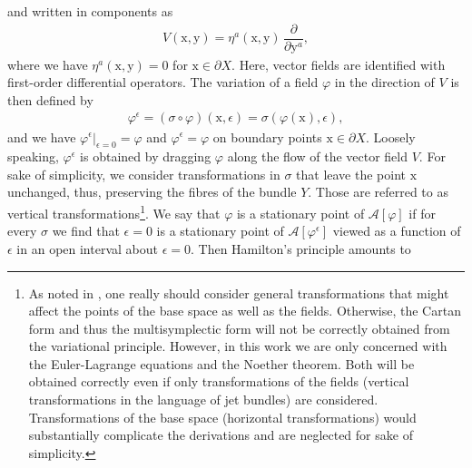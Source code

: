 \documentclass[12pt,a4paper,reqno]{article}
\begin{document}
and written in components as
\begin{align}
V ({\ensuremath{{\ensuremath{\mathrm{{x}}}}}}, {\ensuremath{{\ensuremath{\mathrm{{y}}}}}}) = \eta^{a} ({\ensuremath{{\ensuremath{\mathrm{{x}}}}}}, {\ensuremath{{\ensuremath{\mathrm{{y}}}}}}) \, \dfrac{\partial}{\partial {\ensuremath{{\ensuremath{\mathrm{{y}}}}}}^{a}} ,
\end{align}
where we have $\eta^{a} ({\ensuremath{{\ensuremath{\mathrm{{x}}}}}}, {\ensuremath{{\ensuremath{\mathrm{{y}}}}}}) = 0$ for ${\ensuremath{{\ensuremath{\mathrm{{x}}}}}} \in \partial X$.
Here, vector fields are identified with first-order differential operators.
The variation of a field ${\ensuremath{\varphi}}$ in the direction of $V$ is then defined by
\begin{align}
{\ensuremath{\varphi}}^{\ensuremath{\epsilon}} = (\sigma \circ {\ensuremath{\varphi}}) ({\ensuremath{{\ensuremath{\mathrm{{x}}}}}}, {\ensuremath{\epsilon}}) = \sigma ( {\ensuremath{\varphi}}({\ensuremath{{\ensuremath{\mathrm{{x}}}}}}), {\ensuremath{\epsilon}}) ,
\end{align}
and we have ${\ensuremath{\varphi}}^{\ensuremath{\epsilon}} \vert_{{\ensuremath{\epsilon}}=0} = {\ensuremath{\varphi}}$ and ${\ensuremath{\varphi}}^{\ensuremath{\epsilon}} = {\ensuremath{\varphi}}$ on boundary points ${\ensuremath{{\ensuremath{\mathrm{{x}}}}}} \in \partial X$.
Loosely speaking, ${\ensuremath{\varphi}}^{\ensuremath{\epsilon}}$ is obtained by dragging ${\ensuremath{\varphi}}$ along the flow of the vector field $V$.
For sake of simplicity, we consider transformations in $\sigma$ that leave the point ${\ensuremath{{\ensuremath{\mathrm{{x}}}}}}$ unchanged, thus, preserving the fibres of the bundle $Y$.
Those are referred to as vertical transformations\footnote{
As noted in \cite{MarsdenPatrick:1998, MarsdenPekarsky:2001}, one really should consider general transformations that might affect the points of the base space as well as the fields. Otherwise, the Cartan form and thus the multisymplectic form will not be correctly obtained from the variational principle.
However, in this work we are only concerned with the Euler-Lagrange equations and the Noether theorem. Both will be obtained correctly even if only transformations of the fields (vertical transformations in the language of jet bundles) are considered.
Transformations of the base space (horizontal transformations) would substantially complicate the derivations and are neglected for sake of simplicity.
}.
We say that ${\ensuremath{\varphi}}$ is a stationary point of $\mathcal{A} [{\ensuremath{\varphi}}]$ if for every $\sigma$ we find that ${\ensuremath{\epsilon}}=0$ is a stationary point of $\mathcal{A} [{\ensuremath{\varphi}}^{\ensuremath{\epsilon}}]$ viewed as a function of ${\ensuremath{\epsilon}}$ in an open interval about ${\ensuremath{\epsilon}} = 0$. Then Hamilton's principle amounts to
\end{document}
